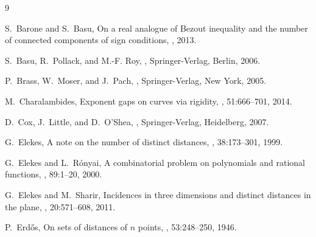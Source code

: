 \documentclass[12pt]{article}
\begin{document}

 
%
%  


\begin{thebibliography}{9}

S.~Barone and S.~Basu,
\newblock On a real analogue of Bezout inequality and the number of connected
  components of sign conditions,
, 2013.

S.~Basu, R.~Pollack, and M.-F. Roy,
,
\newblock Springer-Verlag, Berlin, 2006.

P.~Brass, W.~Moser, and J.~Pach,
,
\newblock Springer-Verlag, New York, 2005.

M.~Charalambides,
\newblock Exponent gaps on curves via rigidity,
, 51:666--701, 2014. 

D.~Cox, J.~Little, and D.~O'Shea,
,
\newblock Springer-Verlag, Heidelberg, 2007.

G.~Elekes,
\newblock A note on the number of distinct distances,
, 38:173--301, 1999.

G.~Elekes and L.~R\'onyai,
\newblock A combinatorial problem on polynomials and rational functions,
, 89:1--20, 2000.

G.~Elekes and M.~Sharir,
\newblock Incidences in three dimensions and distinct distances in the plane,
, 20:571--608, 2011.

P.~Erd\H os,
\newblock On sets of distances of $n$ points,
, 53:248--250, 1946.


\end{thebibliography}
\end{document}
